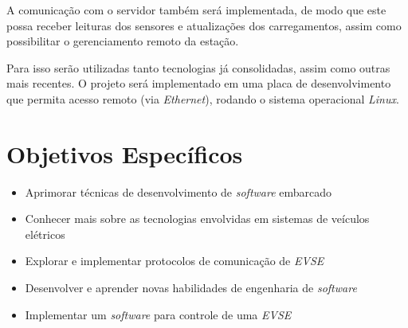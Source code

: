     A comunicação com o servidor também será implementada, de modo que este possa receber leituras dos sensores e atualizações dos carregamentos, assim como possibilitar o gerenciamento remoto da estação.

    Para isso serão utilizadas tanto tecnologias já consolidadas, assim como outras mais recentes. O projeto será implementado em uma placa de desenvolvimento que permita acesso remoto (via \textit{Ethernet}), rodando o sistema operacional \textit{Linux}.

  \section{Objetivos Específicos}
  \label{stateofart:intro:specificobjectives}

    \begin{itemize}
      \item Aprimorar técnicas de desenvolvimento de \textit{software} embarcado
      \item Conhecer mais sobre as tecnologias envolvidas em sistemas de veículos elétricos
      \item Explorar e implementar protocolos de comunicação de \textit{\ac{EVSE}}
      \item Desenvolver e aprender novas habilidades de engenharia de \textit{software}
      \item Implementar um \textit{software} para controle de uma \textit{\ac{EVSE}}
    \end{itemize}
